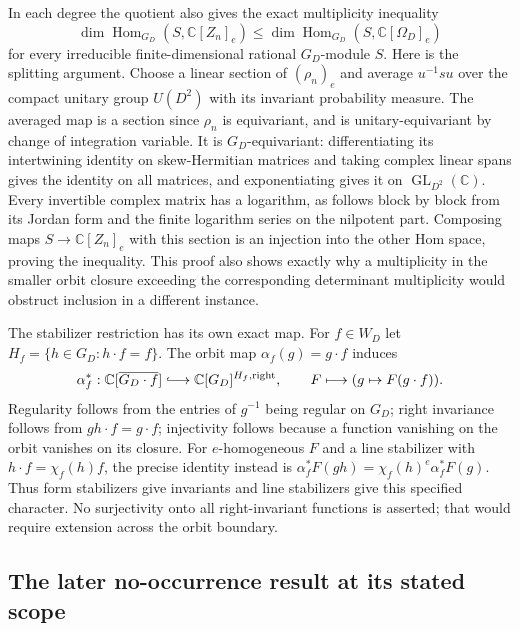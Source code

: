 In each degree the quotient also gives the exact multiplicity inequality
\[
 \dim\operatorname{Hom}_{G_D}(S,\mathbb C[Z_n]_e)
 \le \dim\operatorname{Hom}_{G_D}(S,\mathbb C[\Omega_D]_e)
\]
for every irreducible finite-dimensional rational $G_D$-module $S$.
Here is the splitting argument. Choose a linear section of $(\rho_n)_e$
and average $u^{-1}s u$ over the compact unitary group $U(D^2)$ with
its invariant probability measure. The averaged map is a section since
$\rho_n$ is equivariant, and is unitary-equivariant by change of integration
variable. It is $G_D$-equivariant: differentiating its intertwining
identity on skew-Hermitian matrices and taking complex linear spans
gives the identity on all matrices, and exponentiating gives it on
$\operatorname{GL}_{D^2}(\mathbb C)$. Every invertible complex matrix has a logarithm,
as follows block by block from its Jordan form and the finite logarithm
series on the nilpotent part. Composing maps $S\to\mathbb C[Z_n]_e$
with this section is an injection into the other Hom space, proving
the inequality. This proof also shows exactly why a multiplicity in the
smaller orbit closure exceeding the corresponding determinant multiplicity
would obstruct inclusion in a different instance.

The stabilizer restriction has its own exact map. For $f\in W_D$ let
$H_f=\{h\in G_D:h\cdot f=f\}$. The orbit map
$\alpha_f(g)=g\cdot f$ induces
\[
 \alpha_f^*:\mathbb C[\overline{G_D\cdot f}]
 \lhook\joinrel\longrightarrow \mathbb C[G_D]^{H_f,\mathrm{right}},
 \qquad F\longmapsto(g\mapsto F(g\cdot f)).
\]
Regularity follows from the entries of $g^{-1}$ being regular on $G_D$;
right invariance follows from $gh\cdot f=g\cdot f$; injectivity follows
because a function vanishing on the orbit vanishes on its closure.
For $e$-homogeneous $F$ and a line stabilizer with
$h\cdot f=\chi_f(h)f$, the precise identity instead is
$\alpha_f^*F(gh)=\chi_f(h)^e\alpha_f^*F(g)$.
Thus form stabilizers give invariants and line stabilizers give this
specified character. No surjectivity onto all right-invariant functions
is asserted; that would require extension across the orbit boundary.

\subsection{The later no-occurrence result at its stated scope}

